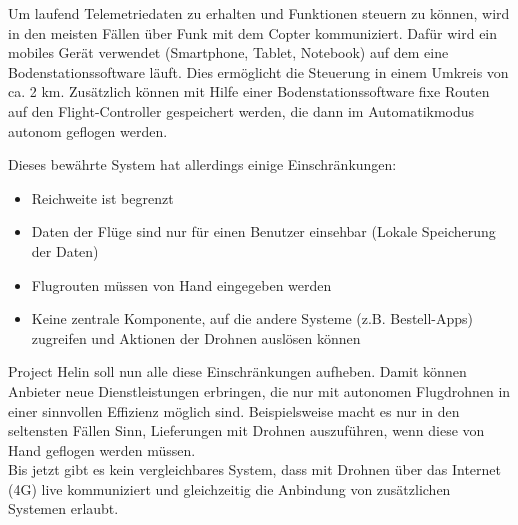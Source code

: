 Um laufend Telemetriedaten zu erhalten und Funktionen steuern zu können, wird in den meisten Fällen über Funk mit dem Copter kommuniziert. Dafür wird ein mobiles Gerät verwendet (Smartphone, Tablet, Notebook) auf dem eine Bodenstationssoftware läuft. Dies ermöglicht die Steuerung in einem Umkreis von ca. 2 km. Zusätzlich können mit Hilfe einer Bodenstationssoftware fixe Routen auf den \Gls{Flight-Controller} gespeichert werden, die dann im Automatikmodus autonom geflogen werden.

\newpage
Dieses bewährte System hat allerdings einige Einschränkungen: 

\begin{itemize}
	\item{Reichweite ist begrenzt}
	\item{Daten der Flüge sind nur für einen Benutzer einsehbar (Lokale Speicherung der Daten)}
	\item{Flugrouten müssen von Hand eingegeben werden}
	\item{Keine zentrale Komponente, auf die andere Systeme (z.B. Bestell-Apps) zugreifen und Aktionen der Drohnen auslösen können}
\end{itemize}

Project Helin soll nun alle diese Einschränkungen aufheben. Damit können Anbieter neue Dienstleistungen erbringen, die nur mit autonomen Flugdrohnen in einer sinnvollen Effizienz möglich sind. Beispielsweise macht es nur in den seltensten Fällen Sinn, Lieferungen mit Drohnen auszuführen, wenn diese von Hand geflogen werden müssen. \\

Bis jetzt gibt es kein vergleichbares System, dass mit Drohnen über das Internet (4G) live kommuniziert und gleichzeitig die Anbindung von zusätzlichen Systemen erlaubt.

